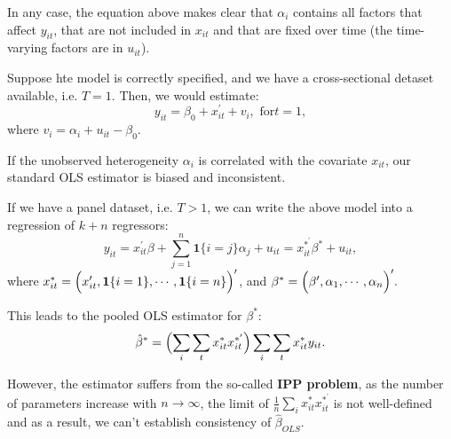 In any case, the equation above makes clear that $\alpha_i $ contains all factors that affect $y_{it}$, that are
not included in $x_{it}$ and that are ﬁxed over time (the time-varying factors are in $u_{it}$).

Suppose hte model is correctly specified, and we have a cross-sectional detaset available, i.e. $T=1$.
Then, we would estimate:
\[y_{it} = \beta_0 + x_{it}^{\prime} + v_i, \text{ for} t=1,\]
where $v_i = \alpha_i + u_{it} -\beta_0.$

If the unobserved heterogeneity $\alpha_i$ is correlated with the covariate $x_{it} $,
our standard OLS estimator is biased and inconsistent.

If we have a panel dataset, i.e. $T>1$, we can write the above model into a regression of $k+n$ regressors:
\[
y_{it} = x_{it}^{\prime} \beta + \sum_{j=1}^{n}\mathbf{1}\{i=j\} \alpha_j + u_{it} = x_{it}^{*^{\prime}} \beta^* + u_{it},
\]
where $x_{it}^* = \Bigl( x_{it}^{\prime}, \mathbf{1}\{i=1\}, \cdots, \mathbf{1}\{i=n\} \Bigr)^{\prime} $,
and $\beta^* = \Bigl( \beta^{\prime}, \alpha_1, \cdots, \alpha_n \Bigr)^{\prime}.$

This leads to the pooled OLS estimator for $\beta^*$:
\[
\hat{\beta}^* = \Bigl( \sum_i \sum_t x_{it}^* x_{it}^{*^{\prime}} \Bigr) \sum_i \sum_t x_{it}^* y_{it}. 
\]

However, the estimator suffers from the so-called \textbf{IPP problem}, 
as the number of parameters increase with $n \rightarrow\infty $, 
the limit of $\frac{1}{n} \sum_i x_{it}^* x_{it}^{*^{\prime}}$ is not well-defined
and as a result, we can't establish consistency of $\hat{\beta}_{OLS}.$